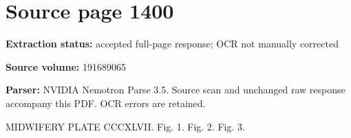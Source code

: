 \clearpage
\section{Source page 1400}
\textbf{Extraction status:} accepted full-page response; OCR not manually corrected\par
\textbf{Source volume:} 191689065\par
\textbf{Parser:} NVIDIA Nemotron Parse 3.5. Source scan and unchanged raw response accompany this PDF. OCR errors are retained.\par\medskip
MIDWIFERY PLATE CCCXLVII.
Fig. 1.
Fig. 2.
Fig. 3.\par\medskip
